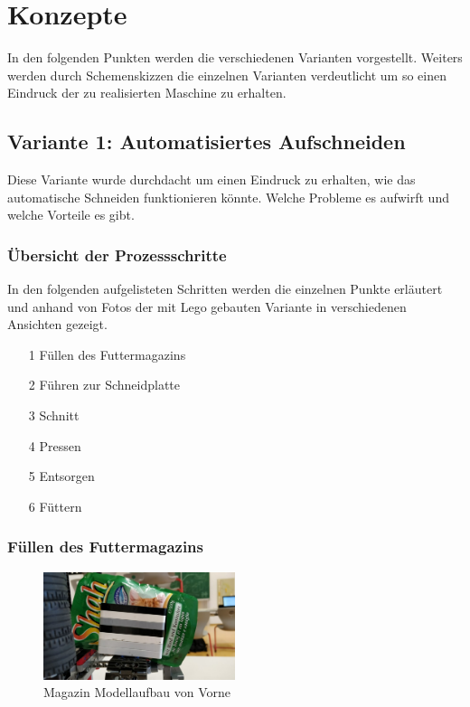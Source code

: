 \section{Konzepte} 

In den folgenden Punkten werden die verschiedenen Varianten vorgestellt. Weiters werden durch Schemenskizzen die einzelnen Varianten verdeutlicht um so einen Eindruck der zu realisierten Maschine zu erhalten.

\subsection{Variante 1: Automatisiertes Aufschneiden} 

Diese Variante wurde durchdacht um einen Eindruck zu erhalten, wie das automatische Schneiden funktionieren könnte. Welche Probleme es aufwirft und welche Vorteile es gibt.

\subsubsection{Übersicht der Prozessschritte}

In den folgenden aufgelisteten Schritten werden die einzelnen Punkte erläutert und anhand von Fotos der mit Lego gebauten Variante in verschiedenen Ansichten gezeigt.

\begin{itemize}
\item[1] Füllen des Futtermagazins
\item[2] Führen zur Schneidplatte
\item[3] Schnitt
\item[4] Pressen
\item[5] Entsorgen
\item[6] Füttern
\end{itemize}



\subsubsection{Füllen des Futtermagazins}


\begin{figure}
\vspace{-30pt}
  \begin{center}
    \includegraphics[width=0.50\textwidth]{Bilder/Ablauf_1_png/Magazin_Vorne}
  \end{center}
  \caption{Magazin Modellaufbau von Vorne}
  \label{Magazin Vorne}
  \vspace{-10pt}
\end{figure}

